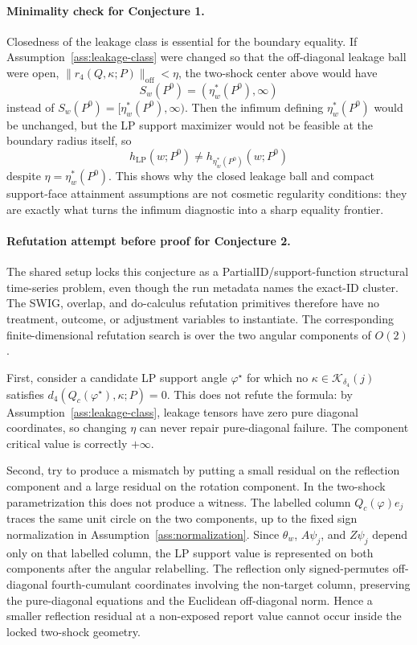 \documentclass[11pt]{article}
\theoremstyle{definition}
\theoremstyle{plain}
\theoremstyle{remark}
\begin{document}
\paragraph{Minimality check for Conjecture 1.}
Closedness of the leakage class is essential for the boundary equality.  If Assumption~\ref{ass:leakage-class} were changed so that the off-diagonal leakage ball were open, \(\|r_4(Q,\kappa;P)\|_{\mathrm{off}}<\eta\), the two-shock center above would have
\[
S_w(P^0)=(\eta_w^*(P^0),\infty)
\]
instead of \(S_w(P^0)=[\eta_w^*(P^0),\infty)\).  Then the infimum defining \(\eta_w^*(P^0)\) would be unchanged, but the LP support maximizer would not be feasible at the boundary radius itself, so
\[
h_{\mathrm{LP}}(w;P^0)\ne h_{\eta_w^*(P^0)}(w;P^0)
\]
despite \(\eta=\eta_w^*(P^0)\).  This shows why the closed leakage ball and compact support-face attainment assumptions are not cosmetic regularity conditions: they are exactly what turns the infimum diagnostic into a sharp equality frontier.

\paragraph{Refutation attempt before proof for Conjecture 2.}
The shared setup locks this conjecture as a PartialID/support-function structural time-series problem, even though the run metadata names the exact-ID cluster.  The SWIG, overlap, and do-calculus refutation primitives therefore have no treatment, outcome, or adjustment variables to instantiate.  The corresponding finite-dimensional refutation search is over the two angular components of \(O(2)\).

First, consider a candidate LP support angle \(\varphi^\star\) for which no \(\kappa\in\mathcal K_{\delta_4}(j)\) satisfies \(d_4(Q_c(\varphi^\star),\kappa;P)=0\).  This does not refute the formula: by Assumption~\ref{ass:leakage-class}, leakage tensors have zero pure diagonal coordinates, so changing \(\eta\) can never repair pure-diagonal failure.  The component critical value is correctly \(+\infty\).

Second, try to produce a mismatch by putting a small residual on the reflection component and a large residual on the rotation component.  In the two-shock parametrization this does not produce a witness.  The labelled column \(Q_c(\varphi)e_j\) traces the same unit circle on the two components, up to the fixed sign normalization in Assumption~\ref{ass:normalization}.  Since \(\theta_w\), \(A\psi_j\), and \(Z\psi_j\) depend only on that labelled column, the LP support value is represented on both components after the angular relabelling.  The reflection only signed-permutes off-diagonal fourth-cumulant coordinates involving the non-target column, preserving the pure-diagonal equations and the Euclidean off-diagonal norm.  Hence a smaller reflection residual at a non-exposed report value cannot occur inside the locked two-shock geometry.
\end{document}
